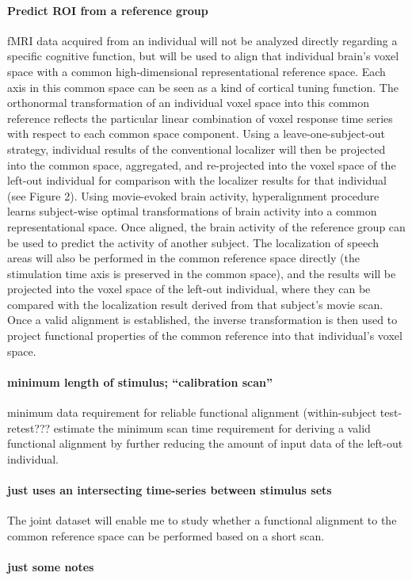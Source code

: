 \paragraph{Predict ROI from a reference group}
%
fMRI data acquired from an individual will not be analyzed directly regarding a
specific cognitive function, but will be used to align that individual brain's
voxel space with a common high-dimensional representational reference space.
%
Each axis in this common space can be seen as a kind of cortical tuning
function.
%
The orthonormal transformation of an individual voxel space into this common
reference reflects the particular linear combination of voxel response time
series with respect to each common space component.
%
Using a leave-one-subject-out strategy, individual results of the conventional
localizer will then be projected into the common space, aggregated, and
re-projected into the voxel space of the left-out individual for comparison with
the localizer results for that individual (see Figure 2).
%
Using movie-evoked brain activity, hyperalignment procedure learns subject-wise
optimal transformations of brain activity into a common representational space.
%
Once aligned, the brain activity of the reference group can be used to predict
the activity of another subject.
%
The localization of speech areas will also be performed in the common reference
space directly (the stimulation time axis is preserved in the common space), and
the results will be projected into the voxel space of the left-out individual,
where they can be compared with the localization result derived from that
subject’s movie scan.
%
Once a valid alignment is established, the inverse transformation is then used
to project functional properties of the common reference into that individual's
voxel space.


\paragraph{minimum length of stimulus; ``calibration scan''}
%
minimum data requirement for reliable functional alignment (within-subject
test-retest???
%
estimate the minimum scan time requirement for deriving a valid functional
alignment by further reducing the amount of input data of the left-out
individual.
\paragraph{just uses an intersecting time-series between stimulus sets}
%
The joint dataset will enable me to study whether a functional alignment to the
common reference space can be performed based on a short scan.




\paragraph{just some notes}

